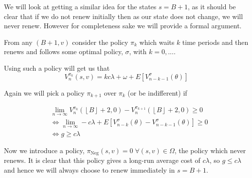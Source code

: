 \documentclass[a4paper,10pt]{article}
\newcommand{\floor}[1]{\left \lfloor #1 \right \rfloor}
\theoremstyle{definition}
\theoremstyle{definition}
\theoremstyle{remark}
\theoremstyle{definition}
\begin{document}
We will look at getting a similar idea for the states $s=B+1$, as it should be clear that if we do not renew initially then as our state does not change, we will never renew. However for completeness sake we will provide a formal argument.

From any $(B+1,v)$ consider the policy $\pi_{k}$ which waits $k$ time periods and then renews and follows some optimal policy, $\sigma$, with $k=0,...$.

Using such a policy will get us that
\begin{equation}
V_{n}^{\pi_{k}}(s,v)= k c \lambda + \omega + E[V_{n-k-1}^{\sigma}(\theta)]
\end{equation}

Again we will pick a policy $\pi_{k+1}$ over $\pi_{k}$ (or be indifferent) if

\begin{align*}
&\lim\limits_{n \rightarrow \infty} V_{n}^{\pi_{k}} (\floor{B}+2,0) - V_{n}^{\pi_{k+1}}(\floor{B}+2,0) \geq 0 \\
& \iff \lim\limits_{n \rightarrow \infty} -c \lambda + E[V_{n-k}^{\sigma}(\theta) - V_{n-k-1}^{\sigma}(\theta)] \geq 0 \\
& \iff g \geq c \lambda
\end{align*}

Now we introduce a policy, $\pi_{\text{Neg}}(s,v)=0 \; \forall (s,v) \in \Omega$, the policy which never renews. It is clear that this policy gives a long-run average cost of $c \lambda$, so $g \leq c \lambda$ and hence we will always choose to renew immediately in $s=B+1 $.
\end{document}
